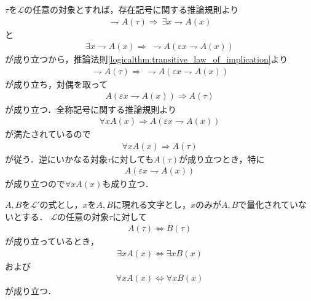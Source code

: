 	\begin{prf}
		$\tau$を$\mathcal{L}$の任意の対象とすれば，存在記号に関する推論規則より
		\begin{align}
			\rightharpoondown A(\tau) \Longrightarrow\ \exists x \rightharpoondown A(x)
		\end{align}
		と
		\begin{align}
			\exists x \rightharpoondown A(x) \Longrightarrow\ \rightharpoondown A
			\left( \varepsilon x \rightharpoondown A(x) \right)
		\end{align}
		が成り立つから，推論法則\ref{logicalthm:transitive_law_of_implication}より
		\begin{align}
			\rightharpoondown A(\tau) \Longrightarrow\ \rightharpoondown A
			\left( \varepsilon x \rightharpoondown A(x) \right)
		\end{align}
		が成り立ち，対偶を取って
		\begin{align}
			A \left( \varepsilon x \rightharpoondown A(x) \right)
			\Longrightarrow A(\tau)
		\end{align}
		が成り立つ．全称記号に関する推論規則より
		\begin{align}
			\forall x A(x) \Longrightarrow A \left( \varepsilon x \rightharpoondown A(x) \right)
		\end{align}
		が満たされているので
		\begin{align}
			\forall x A(x) \Longrightarrow A(\tau)
		\end{align}
		が従う．逆にいかなる対象$\tau$に対しても$A(\tau)$が成り立つとき，特に
		\begin{align}
			A \left( \varepsilon x \rightharpoondown A(x) \right)
		\end{align}
		が成り立つので$\forall x A(x)$も成り立つ．
		\QED
	\end{prf}
	
	
	\begin{screen}
		\begin{logicalthm}[量化記号の性質(イ)]\label{logicalthm:properties_of_quantifiers}
			$A,B$を$\mathcal{L}'$の式とし，$x$を$A,B$に現れる文字とし，$x$のみが$A,B$で量化されていないとする．
			$\mathcal{L}$の任意の対象$\tau$に対して
			\begin{align}
				A(\tau) \Longleftrightarrow B(\tau)
			\end{align}
			が成り立っているとき，
			\begin{align}
				\exists x A(x) \Longleftrightarrow \exists x B(x)
			\end{align}
			および
			\begin{align}
				\forall x A(x) \Longleftrightarrow \forall x B(x)
			\end{align}
			が成り立つ．
		\end{logicalthm}
	\end{screen}
	

